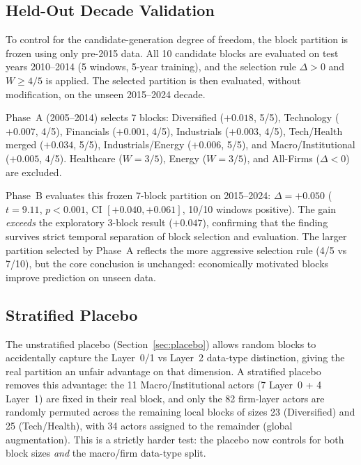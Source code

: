 \documentclass[11pt,a4paper]{article}
\begin{document}
\subsection{Held-Out Decade Validation}
\label{sec:held_out}

To control for the candidate-generation degree of freedom, the block partition is frozen using only pre-2015 data. All 10 candidate blocks are evaluated on test years 2010--2014 (5 windows, 5-year training), and the selection rule $\Delta > 0$ and $W \geq 4/5$ is applied. The selected partition is then evaluated, without modification, on the unseen 2015--2024 decade.

Phase~A (2005--2014) selects 7 blocks: Diversified ($+0.018$, 5/5), Technology ($+0.007$, 4/5), Financials ($+0.001$, 4/5), Industrials ($+0.003$, 4/5), Tech/Health merged ($+0.034$, 5/5), Industrials/Energy ($+0.006$, 5/5), and Macro/Institutional ($+0.005$, 4/5). Healthcare ($W = 3/5$), Energy ($W = 3/5$), and All-Firms ($\Delta < 0$) are excluded.

Phase~B evaluates this frozen 7-block partition on 2015--2024: $\Delta = +0.050$ ($t = 9.11$, $p < 0.001$, CI $[+0.040, +0.061]$, 10/10 windows positive). The gain \emph{exceeds} the exploratory 3-block result ($+0.047$), confirming that the finding survives strict temporal separation of block selection and evaluation. The larger partition selected by Phase~A reflects the more aggressive selection rule (4/5 vs 7/10), but the core conclusion is unchanged: economically motivated blocks improve prediction on unseen data.

\subsection{Stratified Placebo}
\label{sec:strat_placebo}

The unstratified placebo (Section~\ref{sec:placebo}) allows random blocks to accidentally capture the Layer~0/1 vs Layer~2 data-type distinction, giving the real partition an unfair advantage on that dimension. A stratified placebo removes this advantage: the 11 Macro/Institutional actors (7 Layer~0 + 4 Layer~1) are fixed in their real block, and only the 82 firm-layer actors are randomly permuted across the remaining local blocks of sizes 23 (Diversified) and 25 (Tech/Health), with 34 actors assigned to the remainder (global augmentation). This is a strictly harder test: the placebo now controls for both block sizes \emph{and} the macro/firm data-type split.
\end{document}
